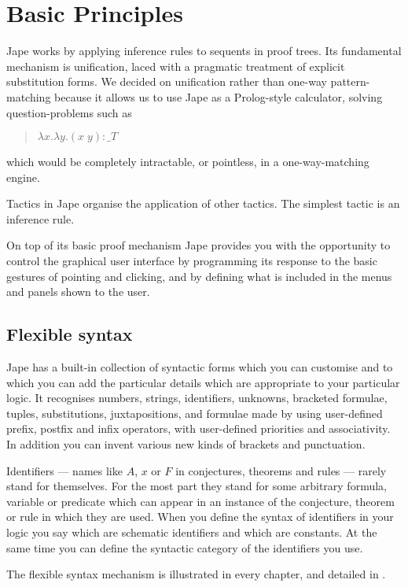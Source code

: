 \chapter{Basic Principles}
\label{chap:basics}

Jape works by applying inference rules to sequents in proof trees. Its fundamental mechanism is unification, laced with a pragmatic treatment of explicit substitution forms. We decided on unification rather than one-way pattern-matching because it allows us to use Jape as a Prolog-style calculator, solving question-problems such as
\begin{quote}
$\lambda x.\lambda y.(x\;y): \_T$
\end{quote}
which would be completely intractable, or pointless, in a one-way-matching engine.

Tactics in Jape organise the application of other tactics. The simplest tactic is an inference rule.

On top of its basic proof mechanism Jape provides you with the opportunity to control the graphical user interface by programming its response to the basic gestures of pointing and clicking, and by defining what is included in the menus and panels shown to the user.

\section{Flexible syntax}

Jape has a built-in collection of syntactic forms which you can customise and to which you can add the particular details which are appropriate to your particular logic. It recognises numbers, strings, identifiers, unknowns, bracketed formulae, tuples, substitutions, juxtapositions, and formulae made by using user-defined prefix, postfix and infix operators, with user-defined priorities and associativity. In addition you can invent various new kinds of brackets and punctuation.

Identifiers --- names like $A$, $x$ or $F$ in conjectures, theorems and rules --- rarely stand for themselves. For the most part they stand for some arbitrary formula, variable or predicate which can appear in an instance of the conjecture, theorem or rule in which they are used. When you define the syntax of identifiers in your logic you say which are schematic identifiers and which are constants. At the same time you can define the syntactic category of the identifiers you use.

The flexible syntax mechanism is illustrated in every chapter, and detailed in .

